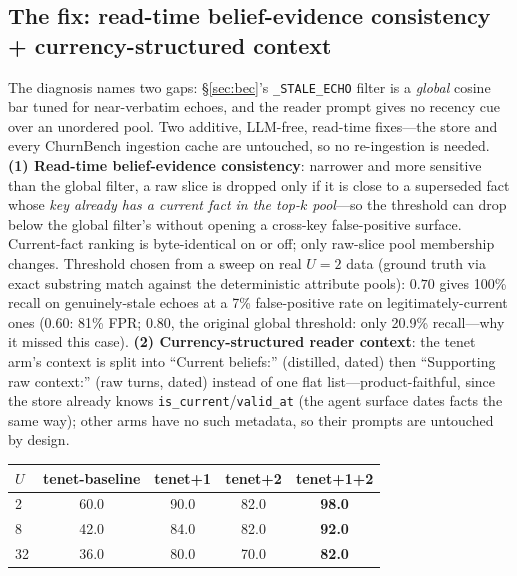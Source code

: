 \documentclass[11pt]{article}
\begin{document}
\subsection{The fix: read-time belief-evidence consistency + currency-structured context}\label{sec:churnfix}
The diagnosis names two gaps: \S\ref{sec:bec}'s \texttt{\_STALE\_ECHO} filter is a
\emph{global} cosine bar tuned for near-verbatim echoes, and the reader prompt gives
no recency cue over an unordered pool. Two additive, LLM-free, read-time fixes---the
store and every ChurnBench ingestion cache are untouched, so no re-ingestion is
needed. \textbf{(1) Read-time belief-evidence consistency}: narrower and more
sensitive than the global filter, a raw slice is dropped only if it is close to a
superseded fact whose \emph{key already has a current fact in the top-$k$ pool}---so
the threshold can drop below the global filter's without opening a cross-key
false-positive surface. Current-fact ranking is byte-identical on or off; only
raw-slice pool membership changes. Threshold chosen from a sweep on real $U{=}2$ data
(ground truth via exact substring match against the deterministic attribute pools):
$0.70$ gives 100\% recall on genuinely-stale echoes at a 7\% false-positive rate on
legitimately-current ones (0.60: 81\% FPR; 0.80, the original global threshold: only
20.9\% recall---why it missed this case). \textbf{(2) Currency-structured reader
context}: the tenet arm's context is split into ``Current beliefs:'' (distilled,
dated) then ``Supporting raw context:'' (raw turns, dated) instead of one flat list---product-faithful,
since the store already knows \texttt{is\_current}/\texttt{valid\_at} (the agent
surface dates facts the same way); other arms have no such metadata, so their prompts
are untouched by design.

\begin{center}
\begin{tabular}{lcccc}
\toprule
$U$ & tenet-baseline & tenet+1 & tenet+2 & \textbf{tenet+1+2}\\
\midrule
2  & 60.0 & 90.0 & 82.0 & \textbf{98.0}\\
8  & 42.0 & 84.0 & 82.0 & \textbf{92.0}\\
32 & 36.0 & 80.0 & 70.0 & \textbf{82.0}\\
\bottomrule
\end{tabular}
\end{center}
\end{document}
